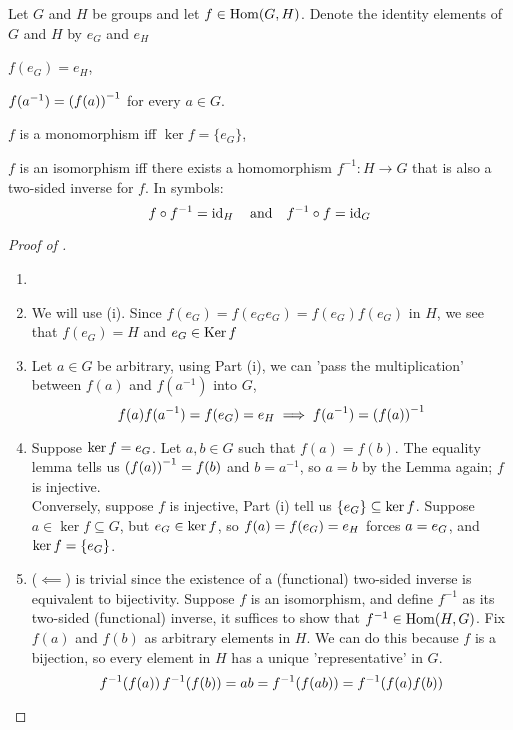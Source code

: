 \documentclass[../main-manifolds.tex]{subfiles}
\begin{document}
\begin{wts}\label{hungerford-chp1:theorem2.3}
    Let $G$ and $H$ be groups and let $f\in \Hom[G,H]$. Denote the identity elements of $G$ and $H$ by $e_G$ and $e_H$
    \begin{enumroman}
        \item $f(e_G)=e_H$,
        \item $f(a^{-1})=\qty(f(a))^{-1}$ for every $a\in G$.
        \item $f$ is a monomorphism iff $\ker f = \{e_G\}$,
        \item $f$ is an isomorphism iff there exists a homomorphism $f^{-1}: H\to G$ that is also a two-sided inverse for $f$. In symbols:
        \begin{equation}\label{hungerford-chp1:theorem2.3-isomorphism-equation}
            f\circ f^{-1}=\id{H}\qqtext{and}f^{-1}\circ f=\id{G}
        \end{equation}
    \end{enumroman}
\end{wts}
\begin{proof}[Proof of ]
    \begin{enumerate}[label={Proof of Part (\roman*): },leftmargin=*]
        \item[]
        \item We will use  (i). Since $f(e_G)=f(e_Ge_G)=f(e_G)f(e_G)$ in $H$, we see that $f(e_G)=H$ and $e_G\in \operatorname{Ker}{f}$
        \item Let $a\in G$ be arbitrary, using Part (i), we can 'pass the multiplication' between $f(a)$ and $f(a^{-1})$ into $G$, 
        \[
            f(a)f(a^{-1})=f(e_G)=e_H\implies f(a^{-1})=\qty(f(a))^{-1}
        \]
        \item Suppose $\ker{f}={e_G}$. Let $a,b\in G$ such that $f(a)=f(b)$. The equality lemma  tells us $\qty(f(a))^{-1}=f(b)$ and $b=a^{-1}$, so $a=b$ by the Lemma again; $f$ is injective.\\

        Conversely, suppose $f$ is injective, Part (i) tell us $\{e_G\}\subseteq \ker{f}$. Suppose $a\in \ker{f}\subseteq G$, but $e_G\in\ker{f}$, so $f(a)=f(e_G)=e_H$ forces $a=e_G$, and $\ker{f}=\{e_G\}$.
        \item ($\impliedby$) is trivial since the existence of a (functional) two-sided inverse is equivalent to bijectivity. Suppose $f$ is an isomorphism, and define $f^{-1}$ as its two-sided (functional) inverse, it suffices to show that $f^{-1}\in\Hom[H,G]$. Fix $f(a)$ and $f(b)$ as arbitrary elements in $H$. We can do this because $f$ is a bijection, so every element in $H$ has a unique 'representative' in $G$. 
        \[
            f^{-1}\qty(f(a))\,f^{-1}\qty(f(b))=ab=f^{-1}\qty(f(ab))=f^{-1}\qty(f(a)f(b))
        \]
    \end{enumerate}
\end{proof}
\end{document}
